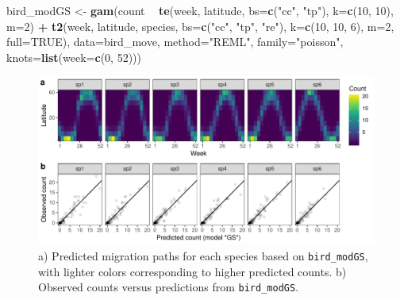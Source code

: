 \documentclass[12pt]{article}
\newenvironment{Shaded}{\begin{snugshade}}{\end{snugshade}}
\newcommand{\KeywordTok}[1]{\textcolor[rgb]{0.13,0.29,0.53}{\textbf{#1}}}
\newcommand{\DataTypeTok}[1]{\textcolor[rgb]{0.13,0.29,0.53}{#1}}
\newcommand{\DecValTok}[1]{\textcolor[rgb]{0.00,0.00,0.81}{#1}}
\newcommand{\StringTok}[1]{\textcolor[rgb]{0.31,0.60,0.02}{#1}}
\newcommand{\OtherTok}[1]{\textcolor[rgb]{0.56,0.35,0.01}{#1}}
\newcommand{\OperatorTok}[1]{\textcolor[rgb]{0.81,0.36,0.00}{\textbf{#1}}}
\newcommand{\NormalTok}[1]{#1}
\begin{document}
\begin{Shaded}
\begin{Highlighting}[]
\NormalTok{bird_modGS <-}\StringTok{ }\KeywordTok{gam}\NormalTok{(count }\OperatorTok{~}\StringTok{ }\KeywordTok{te}\NormalTok{(week, latitude, }\DataTypeTok{bs=}\KeywordTok{c}\NormalTok{(}\StringTok{"cc"}\NormalTok{, }\StringTok{"tp"}\NormalTok{),}
                             \DataTypeTok{k=}\KeywordTok{c}\NormalTok{(}\DecValTok{10}\NormalTok{, }\DecValTok{10}\NormalTok{), }\DataTypeTok{m=}\DecValTok{2}\NormalTok{) }\OperatorTok{+}
\StringTok{                    }\KeywordTok{t2}\NormalTok{(week, latitude, species, }\DataTypeTok{bs=}\KeywordTok{c}\NormalTok{(}\StringTok{"cc"}\NormalTok{, }\StringTok{"tp"}\NormalTok{, }\StringTok{"re"}\NormalTok{),}
                       \DataTypeTok{k=}\KeywordTok{c}\NormalTok{(}\DecValTok{10}\NormalTok{, }\DecValTok{10}\NormalTok{, }\DecValTok{6}\NormalTok{), }\DataTypeTok{m=}\DecValTok{2}\NormalTok{, }\DataTypeTok{full=}\OtherTok{TRUE}\NormalTok{),}
                  \DataTypeTok{data=}\NormalTok{bird_move, }\DataTypeTok{method=}\StringTok{"REML"}\NormalTok{, }\DataTypeTok{family=}\StringTok{"poisson"}\NormalTok{, }
                  \DataTypeTok{knots=}\KeywordTok{list}\NormalTok{(}\DataTypeTok{week=}\KeywordTok{c}\NormalTok{(}\DecValTok{0}\NormalTok{, }\DecValTok{52}\NormalTok{)))}
\end{Highlighting}
\end{Shaded}

\begin{figure}
\includegraphics[width=\linewidth]{../figures/bird_modGS_ggplot-1} \caption{\label{fig:bird_modGS}a) Predicted migration paths for each species based on \texttt{bird\_modGS}, with lighter colors corresponding to higher predicted counts. b) Observed counts versus predictions from \texttt{bird\_modGS}.}\label{fig:bird_modGS_ggplot}
\end{figure}
\end{document}
